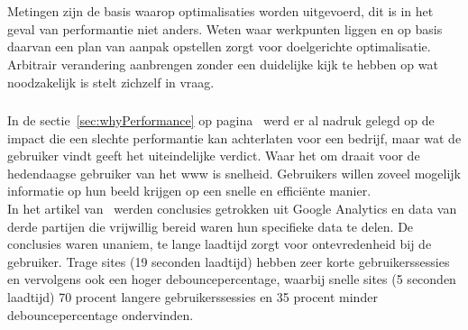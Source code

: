 
\chapter{}
\label{ch:reactPerformantie}

\section{}
\label{sec:importantMetrics}

Metingen zijn de basis waarop optimalisaties worden uitgevoerd, dit is in het geval van performantie niet anders. Weten waar werkpunten liggen en op basis daarvan een plan van aanpak opstellen zorgt voor doelgerichte optimalisatie. Arbitrair verandering aanbrengen zonder een duidelijke kijk te hebben op wat noodzakelijk is stelt zichzelf in vraag.

\subsection{}
\label{sec:biggestFactor}

In de sectie~\ref{sec:whyPerformance} op pagina~\pageref{sec:whyPerformance} werd er al nadruk gelegd op de impact die een slechte performantie kan achterlaten voor een bedrijf, maar wat de gebruiker vindt geeft het uiteindelijke verdict. Waar het om draait voor de hedendaagse gebruiker van het \gls{www} is snelheid. Gebruikers willen zoveel mogelijk informatie op hun beeld krijgen op een snelle en efficiënte manier. \\
In het artikel van~\textcite{Everts2016} werden conclusies getrokken uit Google Analytics en data van derde partijen die vrijwillig bereid waren hun specifieke data te delen. De conclusies waren unaniem, te lange laadtijd zorgt voor ontevredenheid bij de gebruiker. Trage sites (19 seconden laadtijd) hebben zeer korte gebruikerssessies en vervolgens ook een hoger debouncepercentage, waarbij snelle sites (5 seconden laadtijd) 70 procent langere gebruikerssessies en 35 procent minder debouncepercentage ondervinden.

\subsection{}
\label{sec:metrics}

